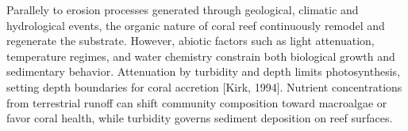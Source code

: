 
Parallely to erosion processes generated through geological, climatic and hydrological events, the organic nature of coral reef continuously remodel and regenerate the substrate. 
However, abiotic factors such as light attenuation, temperature regimes, and water chemistry constrain both biological growth and sedimentary behavior. Attenuation by turbidity and depth limits photosynthesis, setting depth boundaries for coral accretion [Kirk, 1994]. 
Nutrient concentrations from terrestrial runoff can shift community composition toward macroalgae or favor coral health, while turbidity governs sediment deposition on reef surfaces. %

